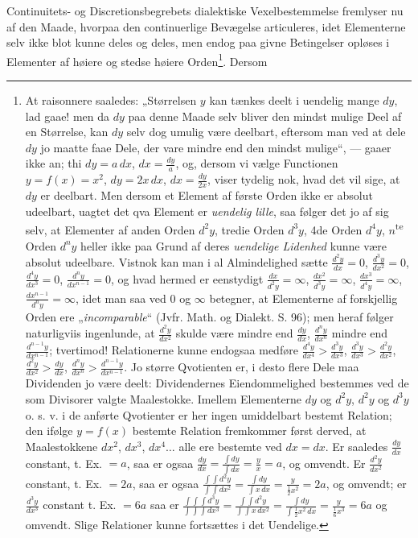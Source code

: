 \documentclass[12pt,a4paper]{book}
\begin{document}
Continuitets- og Discretionsbegrebets dialektiske Vexelbestemmelse
fremlyser nu af den Maade, hvorpaa den continuerlige
Bevægelse articuleres, idet Elementerne selv ikke
blot kunne deles og deles, men endog paa givne Betingelser
opløses i Elementer af høiere og stedse høiere Orden\footnote{At
raisonnere saaledes: „Størrelsen $y$ kan tænkes deelt i uendelig
mange $dy$, lad gaae! men da $dy$ paa denne Maade selv bliver
den mindst mulige Deel af en Størrelse, kan $dy$ selv dog umulig
være deelbart, eftersom man ved at dele $dy$ jo maatte faae Dele,
der vare mindre end den mindst mulige“, --- gaaer ikke an; thi
$dy = a\,dx$, $dx = \frac{dy}{a}$, og, dersom vi vælge Functionen
$y = f(x) = x^2$, $dy = 2x\,dx$, $dx = \frac{dy}{2x}$, viser
tydelig nok, hvad det vil sige, at $dy$ er deelbart. Men dersom
et Element af første Orden ikke er absolut udeelbart, uagtet det
qva Element er \emph{uendelig lille}, saa følger det jo af sig
selv, at Elementer af anden Orden $d^2y$, tredie Orden $d^3y$,
4de Orden $d^4y$, $n$\textsuperscript{te} Orden $d^ny$ heller
ikke paa Grund af deres \emph{uendelige Lidenhed} kunne være
absolut udeelbare. Vistnok kan man i al Almindelighed sætte
$\frac{d^2y}{dx} = 0$, $\frac{d^3y}{dx^2} = 0$,
$\frac{d^4y}{dx^3} = 0$, $\frac{d^ny}{dx^{n-1}} = 0$, og hvad
hermed er eenstydigt $\frac{dx}{d^2y} = \infty$,
$\frac{dx^2}{d^3y} = \infty$, $\frac{dx^3}{d^4y} = \infty$,
$\frac{dx^{n-1}}{d^ny} = \infty$, idet man saa ved $0$ og
$\infty$ betegner, at Elementerne af forskjellig Orden ere
„\textit{incomparable}“ (Jvfr. Math. og Dialekt. S. 96); men
heraf følger naturligviis ingenlunde, at $\frac{d^2y}{dx^2}$
skulde være mindre end $\frac{dy}{dx}$, $\frac{d^ny}{dx^n}$
mindre end $\frac{d^{n-1}y}{dx^{n-1}}$; tvertimod! Relationerne
kunne endogsaa medføre $\frac{d^4y}{dx^4} > \frac{d^3y}{dx^3}$,
$\frac{d^3y}{dx^3} > \frac{d^2y}{dx^2}$,
$\frac{d^2y}{dx^2} > \frac{dy}{dx}$,
$\frac{d^ny}{dx^n} > \frac{d^{n-1}y}{dx^{n-1}}$. Jo større
Qvotienten er, i desto flere Dele maa Dividenden jo være deelt:
Dividendernes Eiendommelighed bestemmes ved de som Divisorer
valgte Maalestokke. Imellem Elementerne $dy$ og $d^2y$, $d^2y$
og $d^3y$ o. s. v. i de anførte Qvotienter er her ingen
umiddelbart bestemt Relation; den ifølge $y = f(x)$ bestemte
Relation fremkommer først derved, at Maalestokkene $dx^2$,
$dx^3$, $dx^4\ldots$ alle ere bestemte ved $dx = dx$. Er
saaledes $\frac{dy}{dx}$ constant, t. Ex. $= a$, saa er ogsaa
$\frac{dy}{dx} = \frac{\int dy}{\int dx} = \frac{y}{x} = a$, og
omvendt. Er $\frac{d^2y}{dx^2}$ constant, t. Ex. $= 2a$, saa er
ogsaa $\frac{\int\int d^2y}{\int\int dx^2}
= \frac{\int dy}{\int x\,dx} = \frac{y}{\frac{1}{2}x^2} = 2a$,
og omvendt; er $\frac{d^3y}{dx^3}$ constant t. Ex. $= 6a$ saa
er $\frac{\int\int\int d^3y}{\int\int\int dx^3}
= \frac{\int\int d^2y}{\int\int x\,dx^2}
= \frac{\int dy}{\int \frac{1}{2}x^2\,dx}
= \frac{y}{\frac{1}{6}x^3} = 6a$ og omvendt. Slige Relationer
kunne fortsættes i det Uendelige.}. Dersom
\end{document}
